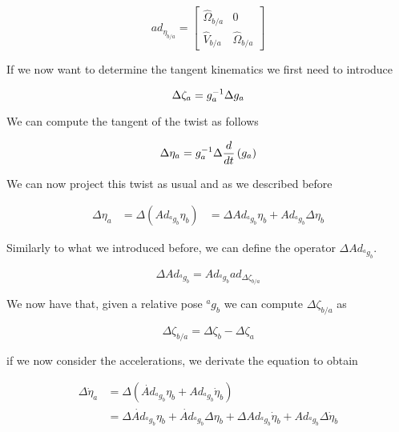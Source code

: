\documentclass[12pt,a4paper]{book}
\newcommand{\agb}{\ensuremath{{^a g _b}}}
\newcommand{\etaa}{\ensuremath{{\eta_{a}}}}
\newcommand{\etab}{\ensuremath{{\eta_{b}}}}
\newcommand{\etaba}{\ensuremath{{\eta_{b/a}}}}
\newcommand{\dotetaa}{\ensuremath{{\dot{\eta}_{a}}}}
\newcommand{\dotetab}{\ensuremath{{\dot{\eta}_{b}}}}
\newcommand{\Adagb}{\ensuremath{Ad_{\agb}}}
\newcommand{\dotAdagb}{\ensuremath{\dot{Ad}_{\agb}}}
\newcommand{\adetaba}{\ensuremath{ad_{\etaba}}}
\newcommand{\Dzetaba}{\ensuremath{{\Delta \zeta_{b/a}}}}
\newcommand{\adDzetaba}{\ensuremath{ad_{\Dzetaba}}}
\begin{document}
\begin{equation}
	\adetaba = 
	\begin{bmatrix}
		\hat{\Omega}_{b/a}	&	0 \\
		\hat{V}_{b/a}			&	\hat{\Omega}_{b/a}
	\end{bmatrix}
\end{equation}


If we now want to determine the tangent kinematics we first need to introduce 

\begin{equation}
	\Delta \zeta_{a} = g_a ^{-1} \Delta g_a
\end{equation}


We can compute the tangent of the twist as follows

\begin{equation}
	\Delta \etaa = g_a \inv \Delta \frac{d}{dt}\left(g_a \right)
\end{equation}

We can now project this twist as usual and as we described before

\begin{equation}
\begin{aligned}
	\Delta \etaa 	&= \Delta  \left( \Adagb \etab \right)
					&= \Delta \Adagb \etab  + \Adagb \Delta \etab 
\end{aligned}
\end{equation}

Similarly to what we introduced before, we can define the operator $\Delta \Adagb$.

\begin{equation}
	\Delta \Adagb = \Adagb \adDzetaba
\end{equation}



We now have that, given a relative pose \agb{} we can compute \Dzetaba{} as 

\begin{equation}
	\Dzetaba = \Delta \zeta _b - \Delta \zeta _a 
\end{equation}


if we now consider the accelerations, we derivate the equation to obtain 

\begin{equation}
\begin{aligned}
	\Delta \dotetaa 	&= \Delta  \left( \dotAdagb \etab + \Adagb \dotetab \right) \\
					&= 
\Delta \dotAdagb \etab+
\dotAdagb \Delta \etab
+
\Delta \Adagb \dotetab+
\Adagb \Delta \dotetab							
\end{aligned}
\end{equation}
\end{document}
